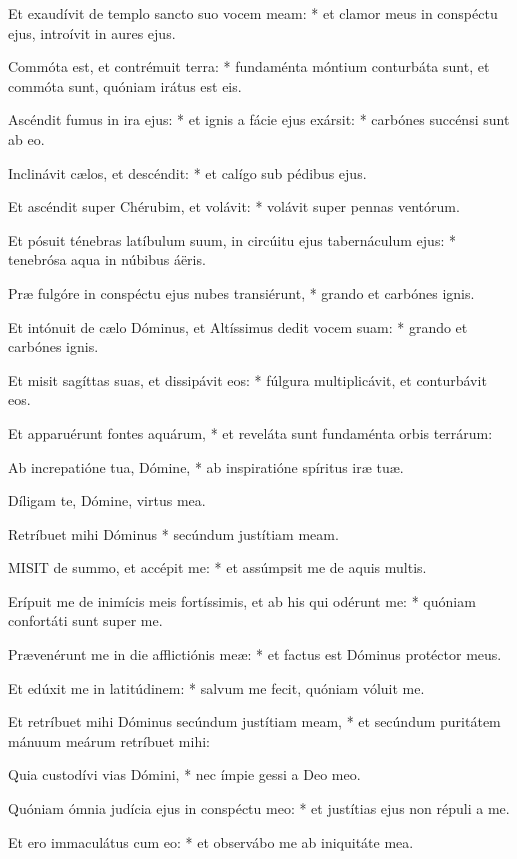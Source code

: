 Et exaudívit de templo sancto suo vocem meam: * et clamor meus in conspéctu ejus, introívit in aures ejus.

Commóta est, et contrémuit terra: * fundaménta móntium conturbáta sunt, et commóta sunt, quóniam irátus est eis.

Ascéndit fumus in ira ejus: * et ignis a fácie ejus exársit: * carbónes succénsi sunt ab eo.

Inclinávit cælos, et descéndit: * et calígo sub pédibus ejus.

Et ascéndit super Chérubim, et volávit: * volávit super pennas ventórum.

Et pósuit ténebras latíbulum suum, in circúitu ejus tabernáculum ejus: * tenebrósa aqua in núbibus áëris.

Præ fulgóre in conspéctu ejus nubes transiérunt, * grando et carbónes ignis.

Et intónuit de cælo Dóminus, et Altíssimus dedit vocem suam: * grando et carbónes ignis.

Et misit sagíttas suas, et dissipávit eos: * fúlgura multiplicávit, et conturbávit eos.

Et apparuérunt fontes aquárum, * et reveláta sunt fundaménta orbis terrárum:

Ab increpatióne tua, Dómine, * ab inspiratióne spíritus iræ tuæ.

 Díligam te, Dómine, virtus mea.

 Retríbuet mihi Dóminus * secúndum justítiam meam.


\lettrine[lines=2]{M}{ISIT} de summo, et accépit me: * et assúmpsit me de aquis multis.

Erípuit me de inimícis meis fortíssimis, et ab his qui odérunt me: * quóniam confortáti sunt super me.

Prævenérunt me in die afflictiónis meæ: * et factus est Dóminus protéctor meus.

Et edúxit me in latitúdinem: * salvum me fecit, quóniam vóluit me.

Et retríbuet mihi Dóminus secúndum justítiam meam, * et secúndum puritátem mánuum meárum retríbuet mihi:

Quia custodívi vias Dómini, * nec ímpie gessi a Deo meo.

Quóniam ómnia judícia ejus in conspéctu meo: * et justítias ejus non répuli a me.

Et ero immaculátus cum eo: * et observábo me ab iniquitáte mea.

